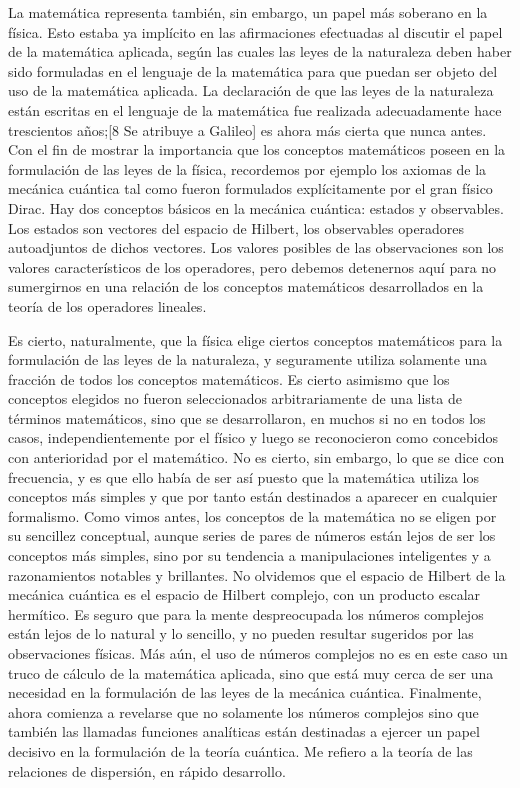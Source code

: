 \documentclass[a4paper, 12pt]{article}
\begin{document}
 

La matemática representa también, sin embargo, un papel más soberano en la física. Esto estaba ya implícito en las afirmaciones efectuadas al discutir el papel de la matemática aplicada, según las cuales las leyes de la naturaleza deben haber sido formuladas en el lenguaje de la matemática para que puedan ser objeto del uso de la matemática aplicada. La declaración de que las leyes de la naturaleza están escritas en el lenguaje de la matemática fue realizada adecuadamente hace trescientos años;[8 Se atribuye a Galileo] es ahora más cierta que nunca antes. Con el fin de mostrar la importancia que los conceptos matemáticos poseen en la formulación de las leyes de la física, recordemos por ejemplo los axiomas de la mecánica cuántica tal como fueron formulados explícitamente por el gran físico Dirac. Hay dos conceptos básicos en la mecánica cuántica: estados y observables. Los estados son vectores del espacio de Hilbert, los observables operadores autoadjuntos de dichos vectores. Los valores posibles de las observaciones son los valores característicos de los operadores, pero debemos detenernos aquí para no sumergirnos en una relación de los conceptos matemáticos desarrollados en la teoría de los operadores lineales.

Es cierto, naturalmente, que la física elige ciertos conceptos matemáticos para la formulación de las leyes de la naturaleza, y seguramente utiliza solamente una fracción de todos los conceptos matemáticos. Es cierto asimismo que los conceptos elegidos no fueron seleccionados arbitrariamente de una lista de términos matemáticos, sino que se desarrollaron, en muchos si no en todos los casos, independientemente por el físico y luego se reconocieron como concebidos con anterioridad por el matemático. No es cierto, sin embargo, lo que se dice con frecuencia, y es que ello había de ser así puesto que la matemática utiliza los conceptos más simples y que por tanto están destinados a aparecer en cualquier formalismo. Como vimos antes, los conceptos de la matemática no se eligen por su sencillez conceptual, aunque series de pares de números están lejos de ser los conceptos más simples, sino por su tendencia a manipulaciones inteligentes y a razonamientos notables y brillantes. No olvidemos que el espacio de Hilbert de la mecánica cuántica es el espacio de Hilbert complejo, con un producto escalar hermítico. Es seguro que para la mente despreocupada los números complejos están lejos de lo natural y lo sencillo, y no pueden resultar sugeridos por las observaciones físicas. Más aún, el uso de números complejos no es en este caso un truco de cálculo de la matemática aplicada, sino que está muy cerca de ser una necesidad en la formulación de las leyes de la mecánica cuántica. Finalmente, ahora comienza a revelarse que no solamente los números complejos sino que también las llamadas funciones analíticas están destinadas a ejercer un papel decisivo en la formulación de la teoría cuántica. Me refiero a la teoría de las relaciones de dispersión, en rápido desarrollo.
\end{document}
